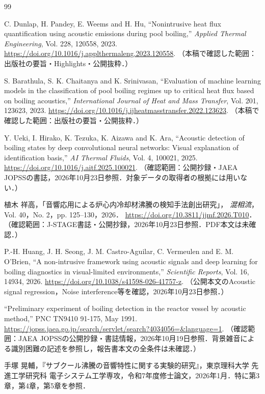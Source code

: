 \begin{thebibliography}{99}
C. Dunlap, H. Pandey, E. Weems and H. Hu,
``Nonintrusive heat flux quantification using acoustic emissions during pool boiling,''
\textit{Applied Thermal Engineering}, Vol. 228, 120558, 2023.
\url{https://doi.org/10.1016/j.applthermaleng.2023.120558}.
（本稿で確認した範囲：出版社の要旨・Highlights・公開抜粋．）

S. Barathula, S. K. Chaitanya and K. Srinivasan,
``Evaluation of machine learning models in the classification of pool boiling regimes up to critical heat flux based on boiling acoustics,''
\textit{International Journal of Heat and Mass Transfer}, Vol. 201, 123623, 2023.
\url{https://doi.org/10.1016/j.ijheatmasstransfer.2022.123623}.
（本稿で確認した範囲：出版社の要旨・公開抜粋．）

Y. Ueki, I. Hirako, K. Tezuka, K. Aizawa and K. Ara,
``Acoustic detection of boiling states by deep convolutional neural networks: Visual explanation of identification basis,''
\textit{AI Thermal Fluids}, Vol. 4, 100021, 2025.
\url{https://doi.org/10.1016/j.aitf.2025.100021}.
（確認範囲：公開抄録・JAEA JOPSSの書誌，2026年10月23日参照．対象データの取得者の根拠には用いない．）

植木 祥高，「音響応用による炉心内冷却材沸騰の検知手法創出研究」，
\textit{混相流}，Vol. 40，No. 2，pp. 125--130，2026．
\url{https://doi.org/10.3811/jjmf.2026.T010}．
（確認範囲：J-STAGE書誌・公開抄録，2026年10月23日参照．PDF本文は未確認．）

P.-H. Huang, J. H. Seong, J. M. Castro-Aguilar, C. Vermeulen and E. M. O'Brien,
``A non-intrusive framework using acoustic signals and deep learning for boiling diagnostics in visual-limited environments,''
\textit{Scientific Reports}, Vol. 16, 14934, 2026.
\url{https://doi.org/10.1038/s41598-026-41757-z}.
（公開本文のAcoustic signal regression，Noise interference等を確認，2026年10月23日参照．）

``Preliminary experiment of boiling detection in the reactor vessel by acoustic method,''
PNC TN9410 91-175, May 1991.
\url{https://jopss.jaea.go.jp/search/servlet/search?4034056=&language=1}.
（確認範囲：JAEA JOPSSの公開抄録・書誌情報，2026年10月19日参照．背景雑音による識別困難の記述を参照し，報告書本文の全条件は未確認．）

手塚 晃輔，『サブクール沸騰の音響特性に関する実験的研究』，東京理科大学 先進工学研究科 電子システム工学専攻，令和7年度修士論文，2026年1月．特に第3章，第4章，第5章を参照．


\end{thebibliography}
